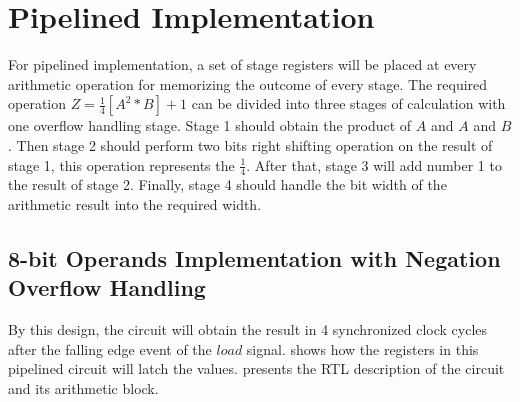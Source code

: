 \section{Pipelined Implementation}

For pipelined implementation, a set of stage registers will be placed at every arithmetic operation for memorizing the outcome of every stage.
The required operation \textbf{\(Z = \frac{1}{4} [A^2\ast B] + 1\)} can be divided into three stages of calculation with one overflow handling stage.
Stage 1 should obtain the product of \(A\) and \(A\) and \(B\).
Then stage 2 should perform two bits right shifting operation on the result of stage 1, this operation represents the \(\frac{1}{4}\).
After that, stage 3 will add number 1 to the result of stage 2.
Finally, stage 4 should handle the bit width of the arithmetic result into the required width.

\subsection{8-bit Operands Implementation with Negation Overflow Handling}

By this design, the circuit will obtain the result in 4 synchronized clock cycles after the falling edge event of the \(load\) signal.
 shows how the registers in this pipelined circuit will latch the values.
 presents the RTL description of the circuit and its arithmetic block.


